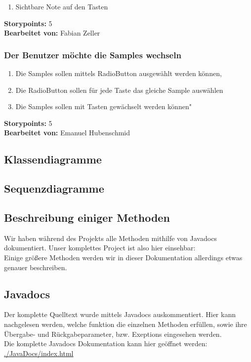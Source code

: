 \begin{enumerate}
 \item Sichtbare Note auf den Tasten
\end{enumerate}

\textbf{Storypoints:} 5 \\
\textbf{Bearbeitet von: } Fabian Zeller \\


\subsubsection{Der Benutzer möchte die Samples wechseln}

\begin{enumerate}
 \item Die Samples sollen mittels RadioButton ausgewählt werden können,
 \item Die RadioButton sollen für jede Taste das gleiche Sample auswählen
 \item Die Samples sollen mit Tasten gewächselt werden können"
\end{enumerate}

\textbf{Storypoints:} 5 \\
\textbf{Bearbeitet von: } Emanuel Hubenschmid \\


\newpage


\subsection{Klassendiagramme}
\subsection{Sequenzdiagramme}


\subsection{Beschreibung einiger Methoden}




Wir haben während des Projekts alle Methoden mithilfe von Javadocs dokumentiert. Unser komplettes 
Project ist also hier einsehbar: %
\\

Einige größere Methoden werden wir in dieser Dokumentation allerdings etwas genauer beschreiben.

\subsection{Javadocs}
Der komplette Quelltext wurde mittels Javadocs auskommentiert. Hier kann nachgelesen werden, welche 
funktion die einzelnen Methoden erfüllen, sowie ihre Übergabe- und Rückgabeparameter, bzw. 
Exeptions  eingesehen werden.\\
Die komplette Javadocs Dokumentation kann hier geöffnet werden:\\
\url{./JavaDocs/index.html}